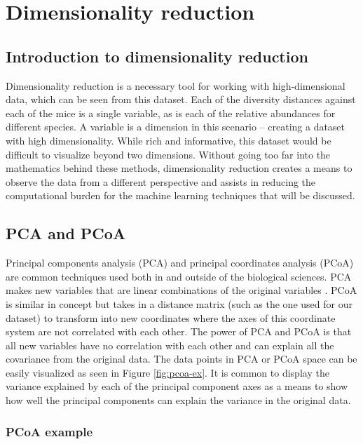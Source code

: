 \documentclass[12pt,openany]{book}
\begin{document}
\chapter{Dimensionality reduction}\label{dim_red}

\section{Introduction to dimensionality
reduction}\label{introduction-to-dimensionality-reduction}

Dimensionality reduction is a necessary tool for working with
high-dimensional data, which can be seen from this dataset. Each of the
diversity distances against each of the mice is a single variable, as is
each of the relative abundances for different species. A variable is a
dimension in this scenario -- creating a dataset with high
dimensionality. While rich and informative, this dataset would be
difficult to visualize beyond two dimensions. Without going too far into
the mathematics behind these methods, dimensionality reduction creates a
means to observe the data from a different perspective and assists in
reducing the computational burden for the machine learning techniques
that will be discussed.

\section{PCA and PCoA}\label{pca-and-pcoa}

Principal components analysis (PCA) and principal coordinates analysis
(PCoA) are common techniques used both in and outside of the biological
sciences. PCA makes new variables that are linear combinations of the
original variables \citep{shalizi}. PCoA is similar in concept but takes
in a distance matrix (such as the one used for our dataset) to transform
into new coordinates where the axes of this coordinate system are not
correlated with each other. The power of PCA and PCoA is that all new
variables have no correlation with each other and can explain all the
covariance from the original data. The data points in PCA or PCoA space
can be easily visualized as seen in Figure \ref{fig:pcoa-ex}. It is
common to display the variance explained by each of the principal
component axes as a means to show how well the principal components can
explain the variance in the original data.

\subsection{PCoA example}\label{pcoa-example}
\end{document}
